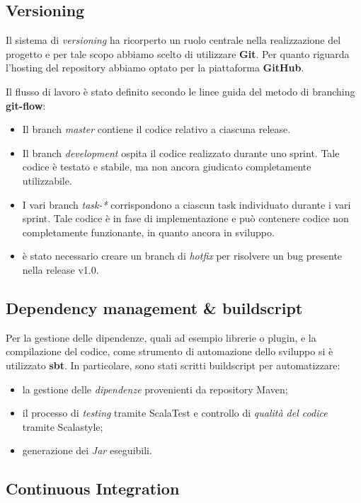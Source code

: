 \subsection{Versioning}\label{subsec:versioning}
Il sistema di \textit{versioning} ha ricorperto un ruolo centrale nella realizzazione del progetto e per tale scopo abbiamo scelto di utilizzare \textbf{Git}.
Per quanto riguarda l'hosting del repository abbiamo optato per la piattaforma \textbf{GitHub}.

Il flusso di lavoro è stato definito secondo le linee guida del metodo di branching \textbf{git-flow}:
\begin{itemize}
	\item Il branch \textit{master} contiene il codice relativo a ciascuna release.
	\item Il branch \textit{development} ospita il codice realizzato durante uno sprint. Tale codice è testato e stabile, ma non ancora giudicato completamente utilizzabile.
	\item I vari branch \textit{task-*} corrispondono a ciascun task individuato durante i vari sprint. Tale codice è in fase di implementazione e può contenere codice non completamente funzionante, in quanto ancora in sviluppo.
	\item è stato necessario creare un branch di \textit{hotfix} per risolvere un bug presente nella release v1.0.
\end{itemize}

\subsection{Dependency management \& buildscript}\label{subsec:build}

Per la gestione delle dipendenze, quali ad esempio librerie o plugin, e la compilazione del codice, come strumento di automazione dello sviluppo si è utilizzato \textbf{sbt}.
In particolare, sono stati scritti buildscript per automatizzare:

\begin{itemize}
    \item la gestione delle \textit{dipendenze} provenienti da repository Maven;
    \item il processo di \textit{testing} tramite ScalaTest e controllo di \textit{qualità del codice} tramite Scalastyle;
    \item generazione dei \textit{Jar} eseguibili.
\end{itemize}

\subsection{Continuous Integration}\label{subsec:ci}

